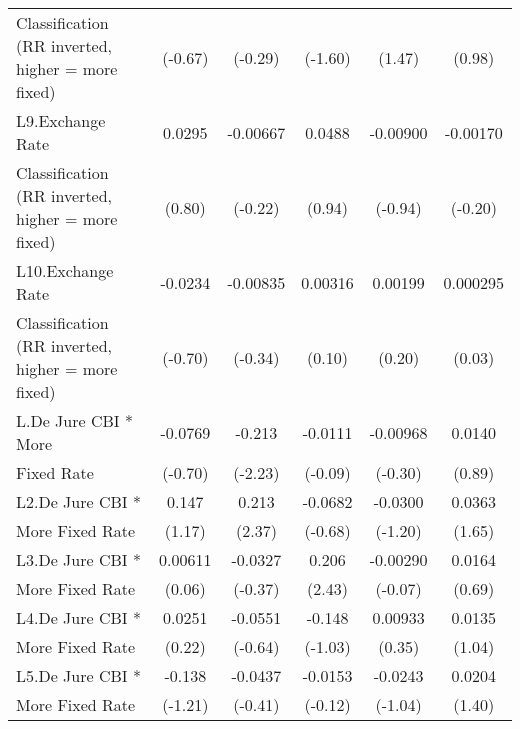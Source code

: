 {\begin{tabular}{l*{5}{c}}
Classification (RR inverted, higher = more fixed)&     (-0.67)         &     (-0.29)         &     (-1.60)         &      (1.47)         &      (0.98)         \\
[1em]
L9.Exchange Rate    &      0.0295         &    -0.00667         &      0.0488         &    -0.00900         &    -0.00170         \\
Classification (RR inverted, higher = more fixed)&      (0.80)         &     (-0.22)         &      (0.94)         &     (-0.94)         &     (-0.20)         \\
[1em]
L10.Exchange Rate   &     -0.0234         &    -0.00835         &     0.00316         &     0.00199         &    0.000295         \\
Classification (RR inverted, higher = more fixed)&     (-0.70)         &     (-0.34)         &      (0.10)         &      (0.20)         &      (0.03)         \\
[1em]
L.De Jure CBI * More&     -0.0769         &      -0.213\sym{*}  &     -0.0111         &    -0.00968         &      0.0140         \\
Fixed Rate          &     (-0.70)         &     (-2.23)         &     (-0.09)         &     (-0.30)         &      (0.89)         \\
[1em]
L2.De Jure CBI *    &       0.147         &       0.213\sym{*}  &     -0.0682         &     -0.0300         &      0.0363         \\
More Fixed Rate     &      (1.17)         &      (2.37)         &     (-0.68)         &     (-1.20)         &      (1.65)         \\
[1em]
L3.De Jure CBI *    &     0.00611         &     -0.0327         &       0.206\sym{*}  &    -0.00290         &      0.0164         \\
More Fixed Rate     &      (0.06)         &     (-0.37)         &      (2.43)         &     (-0.07)         &      (0.69)         \\
[1em]
L4.De Jure CBI *    &      0.0251         &     -0.0551         &      -0.148         &     0.00933         &      0.0135         \\
More Fixed Rate     &      (0.22)         &     (-0.64)         &     (-1.03)         &      (0.35)         &      (1.04)         \\
[1em]
L5.De Jure CBI *    &      -0.138         &     -0.0437         &     -0.0153         &     -0.0243         &      0.0204         \\
More Fixed Rate     &     (-1.21)         &     (-0.41)         &     (-0.12)         &     (-1.04)         &      (1.40)         \\

\end{tabular}}
